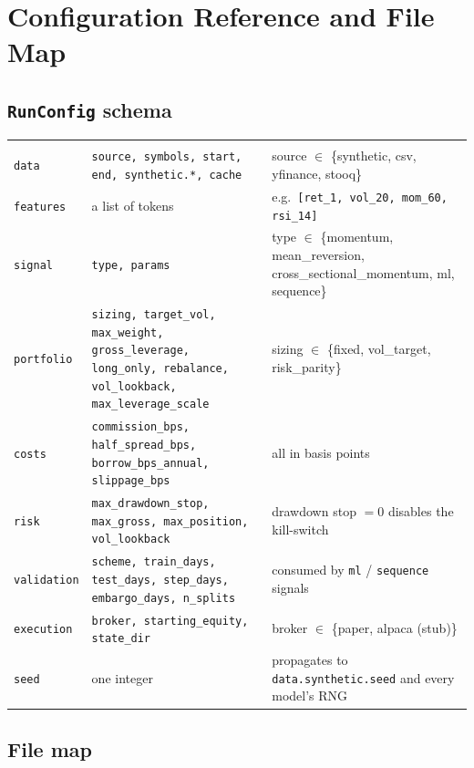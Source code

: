 \chapter{Configuration Reference and File Map}

\section{\texttt{RunConfig} schema}

\begin{longtable}{L{2.6cm} L{3.6cm} L{8.4cm}}
\toprule
{} &  &  \\
\midrule
\endfirsthead
\toprule
{} &  &  \\
\midrule
\endhead
\bottomrule
\endfoot
\texttt{data} & \texttt{source, symbols, start, end, synthetic.*, cache} & source $\in$ \{synthetic, csv, yfinance, stooq\} \\
\texttt{features} & a list of tokens & e.g.\ \texttt{[ret\_1, vol\_20, mom\_60, rsi\_14]} \\
\texttt{signal} & \texttt{type, params} & type $\in$ \{momentum, mean\_reversion, cross\_sectional\_momentum, ml, sequence\} \\
\texttt{portfolio} & \texttt{sizing, target\_vol, max\_weight, gross\_leverage, long\_only, rebalance, vol\_lookback, max\_leverage\_scale} & sizing $\in$ \{fixed, vol\_target, risk\_parity\} \\
\texttt{costs} & \texttt{commission\_bps, half\_spread\_bps, borrow\_bps\_annual, slippage\_bps} & all in basis points \\
\texttt{risk} & \texttt{max\_drawdown\_stop, max\_gross, max\_position, vol\_lookback} & drawdown stop $= 0$ disables the kill-switch \\
\texttt{validation} & \texttt{scheme, train\_days, test\_days, step\_days, embargo\_days, n\_splits} & consumed by \texttt{ml} / \texttt{sequence} signals \\
\texttt{execution} & \texttt{broker, starting\_equity, state\_dir} & broker $\in$ \{paper, alpaca (stub)\} \\
\texttt{seed} & one integer & propagates to \texttt{data.synthetic.seed} and every model's RNG \\
\end{longtable}

\section{File map}

